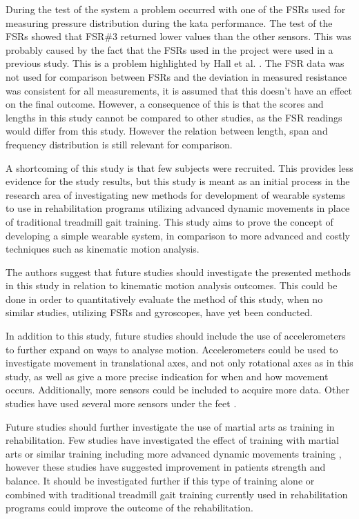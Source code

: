 During the test of the system a problem occurred with one of the FSRs used for measuring pressure distribution during the kata performance. The test of the FSRs showed that FSR\#3 returned lower values than the other sensors. This was probably caused by the fact that the FSRs used in the project were used in a previous study. This is a problem highlighted by Hall et al. \cite{Hall2008}. The FSR data was not used for comparison between FSRs and the deviation in measured resistance was consistent for all measurements, it is assumed that this doesn’t have an effect on the final outcome. However, a consequence of this is that the scores and lengths in this study cannot be compared to other studies, as the FSR readings would differ from this study. However the relation between length, span and frequency distribution is still relevant for comparison.

A shortcoming of this study is that few subjects were recruited. This provides less evidence for the study results, but this study is meant as an initial process in the research area of investigating new methods for development of wearable systems to use in rehabilitation programs utilizing advanced dynamic movements in place of traditional treadmill gait training. This study aims to prove the concept of developing a simple wearable system, in comparison to more advanced and costly techniques such as kinematic motion analysis. 

The authors suggest that future studies should investigate the presented methods in this study in relation to kinematic motion analysis outcomes. This could be done in order to quantitatively evaluate the method of this study, when no similar studies, utilizing FSRs and gyroscopes, have yet been conducted. 

In addition to this study, future studies should include the use of accelerometers to further expand on ways to analyse motion. Accelerometers could be used to investigate movement in translational axes, and not only rotational axes as in this study, as well as give a more precise indication for when and how movement occurs. Additionally, more sensors could be included to acquire more data. Other studies have used several more sensors under the feet \cite{Hessert2005, Hu2018}.

Future studies should further investigate the use of martial arts as training in rehabilitation. Few studies have investigated the effect of training with martial arts or similar training including more advanced dynamic movements training \cite{Winser2018, Ding2012}, however these studies have suggested improvement in patients strength and balance. It should be investigated further if this type of training alone or combined with traditional treadmill gait training currently used in rehabilitation programs could improve the outcome of the rehabilitation.



